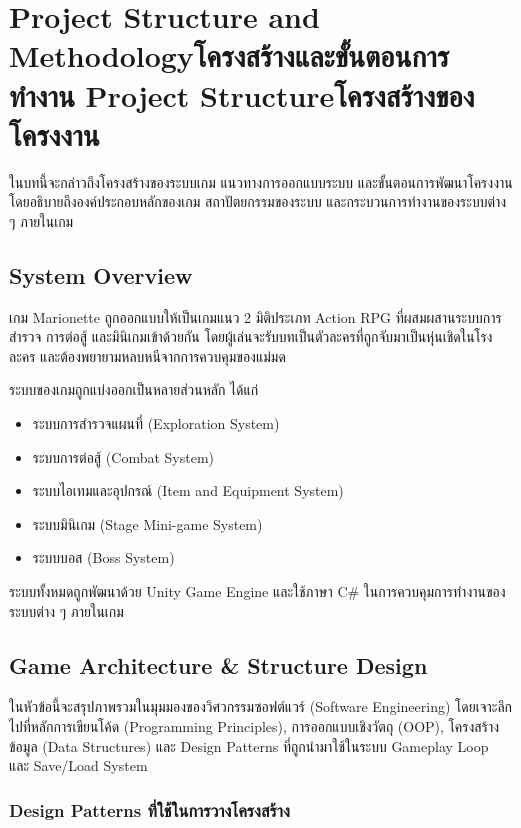 \chapter{\ifproject%
\ifenglish Project Structure and Methodology\else โครงสร้างและขั้นตอนการทำงาน\fi
\else%
\ifenglish Project Structure\else โครงสร้างของโครงงาน\fi
\fi
}

ในบทนี้จะกล่าวถึงโครงสร้างของระบบเกม แนวทางการออกแบบระบบ และขั้นตอนการพัฒนาโครงงาน โดยอธิบายถึงองค์ประกอบหลักของเกม สถาปัตยกรรมของระบบ และกระบวนการทำงานของระบบต่าง ๆ ภายในเกม

\section{System Overview}

เกม Marionette ถูกออกแบบให้เป็นเกมแนว 2 มิติประเภท Action RPG ที่ผสมผสานระบบการสำรวจ การต่อสู้ และมินิเกมเข้าด้วยกัน โดยผู้เล่นจะรับบทเป็นตัวละครที่ถูกจับมาเป็นหุ่นเชิดในโรงละคร และต้องพยายามหลบหนีจากการควบคุมของแม่มด

ระบบของเกมถูกแบ่งออกเป็นหลายส่วนหลัก ได้แก่

\begin{itemize}
\item ระบบการสำรวจแผนที่ (Exploration System)
\item ระบบการต่อสู้ (Combat System)
\item ระบบไอเทมและอุปกรณ์ (Item and Equipment System)
\item ระบบมินิเกม (Stage Mini-game System)
\item ระบบบอส (Boss System)
\end{itemize}

ระบบทั้งหมดถูกพัฒนาด้วย Unity Game Engine และใช้ภาษา C\# ในการควบคุมการทำงานของระบบต่าง ๆ ภายในเกม

\section{Game Architecture \& Structure Design}

ในหัวข้อนี้จะสรุปภาพรวมในมุมมองของวิศวกรรมซอฟต์แวร์ (Software Engineering) โดยเจาะลึกไปที่หลักการเขียนโค้ด (Programming Principles), การออกแบบเชิงวัตถุ (OOP), โครงสร้างข้อมูล (Data Structures) และ Design Patterns ที่ถูกนำมาใช้ในระบบ Gameplay Loop และ Save/Load System

\subsection{Design Patterns ที่ใช้ในการวางโครงสร้าง}

